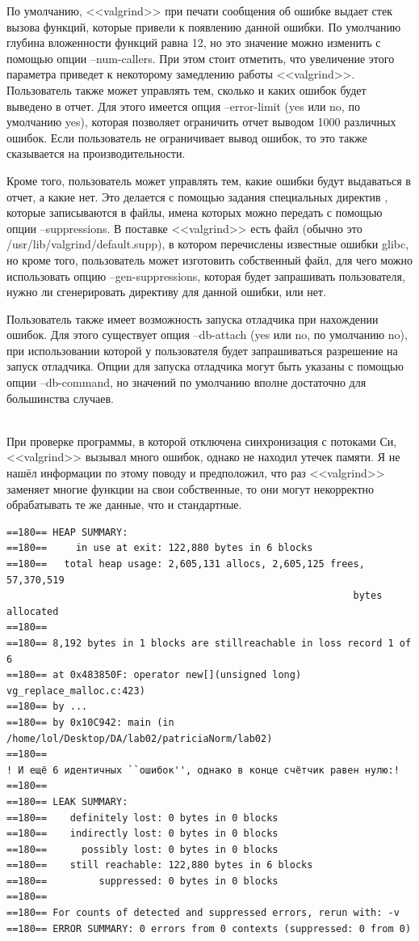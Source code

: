 \documentclass[12pt]{article}
\begin{document}
По умолчанию, <<valgrind>> при печати сообщения об ошибке выдает стек вызова функций, которые привели к появлению данной ошибки. По умолчанию глубина вложенности функций равна 12, но это значение можно изменить с помощью опции --num-callers. При этом стоит отметить, что увеличение этого параметра приведет к некоторому замедлению работы <<valgrind>>.
Пользователь также может управлять тем, сколько и каких ошибок будет выведено в отчет. Для этого имеется опция --error-limit (yes или no, по умолчанию yes), которая позволяет ограничить отчет выводом 1000 различных ошибок. Если пользователь не ограничивает вывод ошибок, то это также сказывается на производительности.

Кроме того, пользователь может управлять тем, какие ошибки будут выдаваться в отчет, а какие нет. Это делается с помощью задания специальных директив , которые записываются в файлы, имена которых можно передать с помощью опции --suppressions. В поставке <<valgrind>> есть файл (обычно это /usr/lib/valgrind/default.supp), в котором перечислены известные ошибки glibc, но кроме того, пользователь может изготовить собственный файл, для чего можно использовать опцию --gen-suppressions, которая будет запрашивать пользователя, нужно ли сгенерировать директиву для данной ошибки, или нет.

Пользователь также имеет возможность запуска отладчика при нахождении ошибок. Для этого существует опция --db-attach (yes или no, по умолчанию no), при использовании которой у пользователя будет запрашиваться разрешение на запуск отладчика. Опции для запуска отладчика могут быть указаны с помощью опции --db-command, но значений по умолчанию вполне достаточно для большинства случаев.

~\\ \indent
При проверке программы, в которой отключена синхронизация с потоками Си, <<valgrind>> вызывал много ошибок, однако не находил утечек памяти. Я не нашёл информации по этому поводу и предположил, что раз <<valgrind>> заменяет многие функции на свои собственные, то они могут некорректно обрабатывать те же данные, что и стандартные.
{\footnotesize
\begin{lstlisting}[escapechar=!]
==180== HEAP SUMMARY:
==180==     in use at exit: 122,880 bytes in 6 blocks
==180==   total heap usage: 2,605,131 allocs, 2,605,125 frees, 57,370,519
                                                            bytes allocated
==180== 
==180== 8,192 bytes in 1 blocks are stillreachable in loss record 1 of 6
==180== at 0x483850F: operator new[](unsigned long) vg_replace_malloc.c:423)
==180== by ...
==180== by 0x10C942: main (in /home/lol/Desktop/DA/lab02/patriciaNorm/lab02)
==180== 
! И ещё 6 идентичных ``ошибок'', однако в конце счётчик равен нулю:!
==180== 
==180== LEAK SUMMARY:
==180==    definitely lost: 0 bytes in 0 blocks
==180==    indirectly lost: 0 bytes in 0 blocks
==180==      possibly lost: 0 bytes in 0 blocks
==180==    still reachable: 122,880 bytes in 6 blocks
==180==         suppressed: 0 bytes in 0 blocks
==180== 
==180== For counts of detected and suppressed errors, rerun with: -v
==180== ERROR SUMMARY: 0 errors from 0 contexts (suppressed: 0 from 0)
\end{lstlisting}
}
\end{document}
